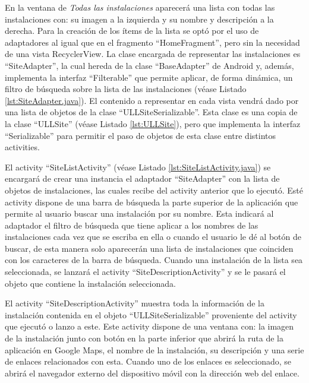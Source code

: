 En la ventana de \textit{Todas las instalaciones}  aparecerá una lista con todas las instalaciones con: su imagen a la izquierda y su nombre y descripción a la derecha. Para la creación de los ítems de la lista se optó por el uso de adaptadores al igual que en el fragmento ``HomeFragment'', pero sin la necesidad de una vista RecyclerView. La clase encargada de representar las instalaciones es ``SiteAdapter'', la cual hereda de la clase ``BaseAdapter'' de Android y, además, implementa la interfaz ``Filterable'' que permite aplicar, de forma dinámica, un filtro de búsqueda sobre la lista de las instalaciones (véase Listado \ref{lst:SiteAdapter.java}). El contenido a representar en cada vista vendrá dado por una lista de objetos de la clase ``ULLSiteSerializable''. Esta clase es una copia de la clase ``ULLSite'' (véase Listado \ref{lst:ULLSite}), pero que implementa la interfaz ``Serializable'' para permitir el paso de objetos de esta clase entre distintos activities. 

\bigskip
\bigskip
\bigskip



\bigskip
\bigskip

El activity ``SiteListActivity'' (véase Listado \ref{lst:SiteListActivity.java}) se encargará de crear una instancia el adaptador ``SiteAdapter'' con la lista de objetos de instalaciones, las cuales recibe del activity anterior que lo ejecutó. Esté activity dispone de una barra de búsqueda la parte superior de la aplicación que permite al usuario buscar una instalación por su nombre. Esta indicará al adaptador el filtro de búsqueda que tiene aplicar a los nombres de las instalaciones cada vez que se escriba en ella o cuando el usuario le dé al botón de buscar, de esta manera solo aparecerán una lista de instalaciones que coinciden con los caracteres de la barra de búsqueda. Cuando una instalación de la lista sea seleccionada, se lanzará el activity ``SiteDescriptionActivity'' y se le pasará el objeto que contiene la instalación seleccionada.


    

El activity ``SiteDescriptionActivity'' muestra toda la información de la instalación contenida en el objeto ``ULLSiteSerializable'' proveniente del activity que ejecutó o lanzo a este. Este activity dispone de una ventana con: la imagen de la instalación junto con botón en la parte inferior que abrirá la ruta de la aplicación en Google Maps, el nombre de la instalación, su descripción y una serie de enlaces relacionados con esta. Cuando uno de los enlaces es seleccionado, se abrirá el navegador externo del dispositivo móvil con la dirección web del enlace.

